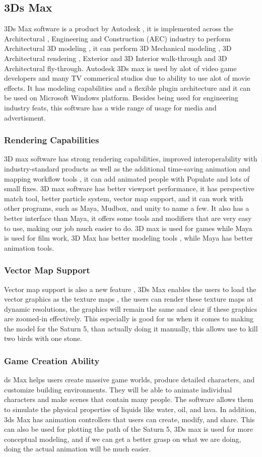 \documentclass[onecolumn, draftclsnofoot,10pt, compsoc]{IEEEtran}
\begin{document}
\subsection{3Ds Max}
3Ds Max software is a product by Autodesk , it is implemented across the Architectural , Engineering and Construction (AEC) industry to perform Architectural 3D modeling , it can perform 3D Mechanical modeling , 3D Architectural rendering , Exterior and 3D Interior walk-through and 3D Architectural fly-through. Autodesk 3Ds max is used by alot of video game developers and many TV commerical studios due to ability to use alot of movie effects. It has modeling capabilities and a flexible plugin architecture and it can be used on Microsoft Windows platform. Besides being used for engineering industry feats, this software has a wide range of usage for media and advertisment. 
\subsubsection{Rendering Capabilities}
3D max software has strong rendering capabilities, improved interoperability with industry-standard products as well as the additional time-saving animation and mapping workflow tools , it can add animated people with Populate and lots of small fixes. 3D max software has better viewport performance, it has perspective match tool, better particle system, vector map support, and it can work with other programs, such as Maya, Mudbox, and unity to name a few. It also has a better interface than Maya, it offers some tools and modifiers that are very easy to use, making our job much easier to do. 3D max is used for games while Maya is used for film work, 3D Max has better modeling tools , while Maya has better animation tools.
\subsubsection{Vector Map Support}
Vector map support is also a new feature , 3Ds Max enables the users to load the vector graphics as the texture maps , the users can render these texture maps at dynamic resolutions, the graphics will remain the same and clear if these graphics are zoomed-in effectively. This especially is good for us when it comes to making the model for the Saturn 5, than actually doing it manually, this allows use to kill two birds with one stone.
\subsubsection{Game Creation Ability}
ds Max helps users create massive game worlds, produce detailed characters, and customize building environments. They will be able to animate individual characters and make scenes that contain many people. The software allows them to simulate the physical properties of liquids like water, oil, and lava. In addition, 3ds Max has animation controllers that users can create, modify, and share. This can also be used for plotting the path of the Saturn 5, 3Ds max is used for more conceptual modeling, and if we can get a better grasp on what we are doing, doing the actual animation will be much easier.
\end{document}
